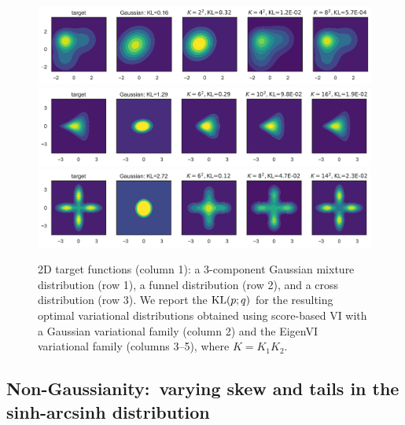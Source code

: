 \begin{figure}[t]
    \centering
    \includegraphics[scale=0.44]{figs/expts-2d-new/density-3gmm-full.pdf}
    \includegraphics[scale=0.44]{figs/expts-2d-new/density-funnel-full.pdf}
    \includegraphics[scale=0.44]{figs/expts-2d-new/density-cross-full.pdf}
\caption{2D target functions (column 1): a 3-component Gaussian mixture distribution (row 1), a
funnel distribution (row 2), and a cross distribution (row 3).
    We report the $\text{KL}(p;q)$ for the resulting optimal variational distributions obtained
    using score-based VI with a Gaussian variational family (column 2)
    and the EigenVI variational family (columns 3--5),
    where $K\!=\!K_1K_2$.
    }
\vspace{-10pt}
\label{fig:2dtargets}
\end{figure}



\subsection{Non-Gaussianity:\ varying skew and tails in the sinh-arcsinh distribution}

